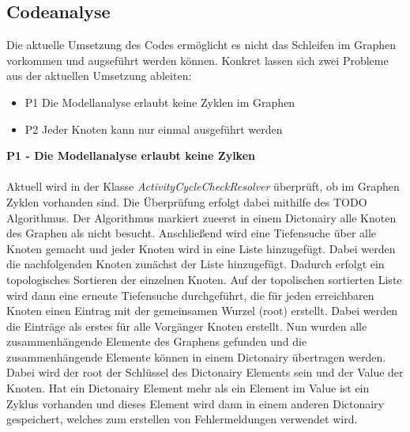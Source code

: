     \subsection{Codeanalyse}
    \label{Codeanalyse}
        Die aktuelle Umsetzung des Codes ermöglicht es nicht das Schleifen im Graphen vorkommen und augseführt werden können. 
        Konkret lassen sich zwei Probleme aus der aktuellen Umsetzung ableiten:
        \begin{itemize}
            \item P1 Die Modellanalyse erlaubt keine Zyklen im Graphen
            \item P2 Jeder Knoten kann nur einmal ausgeführt werden
        \end{itemize}
        \textbf{P1 - Die Modellanalyse erlaubt keine Zylken}\\
        \\
        Aktuell wird in der Klasse \textit{ActivityCycleCheckResolver} überprüft, ob im Graphen Zyklen vorhanden sind. 
        Die Überprüfung erfolgt dabei mithilfe des TODO Algorithmus.
        Der Algorithmus markiert zueerst in einem Dictonairy alle Knoten des Graphen als nicht besucht. 
        Anschließend wird eine Tiefensuche über alle Knoten gemacht und jeder Knoten wird in eine Liste hinzugefügt. 
        Dabei werden die nachfolgenden Knoten zunächst der Liste hinzugefügt. 
        Dadurch erfolgt ein topologisches Sortieren der einzelnen Knoten.
        Auf der topolischen sortierten Liste wird dann eine erneute Tiefensuche durchgeführt, die für jeden erreichbaren Knoten einen Eintrag mit der gemeinsamen Wurzel (root) erstellt. 
        Dabei werden die Einträge als erstes für alle Vorgänger Knoten erstellt.
        Nun wurden alle zusammenhängende Elemente des Graphens gefunden und die zusammenhängende Elemente können in einem Dictonairy übertragen werden. 
        Dabei wird der root der Schlüssel des Dictonairy Elements sein und der Value der Knoten. %
        Hat ein Dictonairy Element mehr als ein Element im Value ist ein Zyklus vorhanden und dieses Element wird dann in einem anderen Dictonairy gespeichert, welches zum erstellen von Fehlermeldungen verwendet wird.
